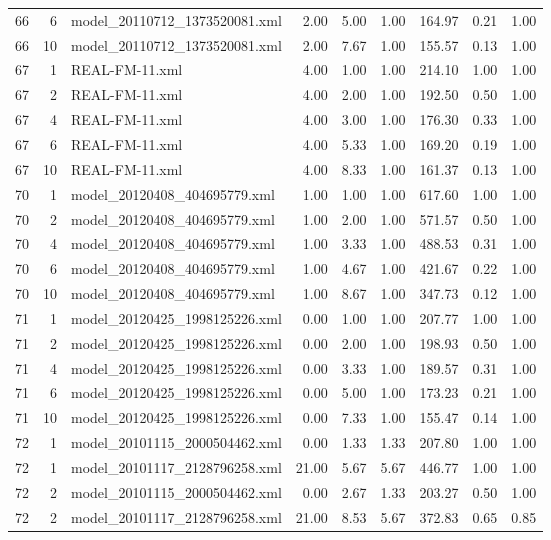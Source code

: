 \begin{table}[ht]
\begin{tabular}{rrlrrrrrr}
   66 &   6 & model\_20110712\_1373520081.xml & 2.00 & 5.00 & 1.00 & 164.97 & 0.21 & 1.00 \\ 
   66 &  10 & model\_20110712\_1373520081.xml & 2.00 & 7.67 & 1.00 & 155.57 & 0.13 & 1.00 \\ 
   67 &   1 & REAL-FM-11.xml & 4.00 & 1.00 & 1.00 & 214.10 & 1.00 & 1.00 \\ 
   67 &   2 & REAL-FM-11.xml & 4.00 & 2.00 & 1.00 & 192.50 & 0.50 & 1.00 \\ 
   67 &   4 & REAL-FM-11.xml & 4.00 & 3.00 & 1.00 & 176.30 & 0.33 & 1.00 \\ 
   67 &   6 & REAL-FM-11.xml & 4.00 & 5.33 & 1.00 & 169.20 & 0.19 & 1.00 \\ 
   67 &  10 & REAL-FM-11.xml & 4.00 & 8.33 & 1.00 & 161.37 & 0.13 & 1.00 \\ 
   70 &   1 & model\_20120408\_404695779.xml & 1.00 & 1.00 & 1.00 & 617.60 & 1.00 & 1.00 \\ 
   70 &   2 & model\_20120408\_404695779.xml & 1.00 & 2.00 & 1.00 & 571.57 & 0.50 & 1.00 \\ 
   70 &   4 & model\_20120408\_404695779.xml & 1.00 & 3.33 & 1.00 & 488.53 & 0.31 & 1.00 \\ 
   70 &   6 & model\_20120408\_404695779.xml & 1.00 & 4.67 & 1.00 & 421.67 & 0.22 & 1.00 \\ 
   70 &  10 & model\_20120408\_404695779.xml & 1.00 & 8.67 & 1.00 & 347.73 & 0.12 & 1.00 \\ 
   71 &   1 & model\_20120425\_1998125226.xml & 0.00 & 1.00 & 1.00 & 207.77 & 1.00 & 1.00 \\ 
   71 &   2 & model\_20120425\_1998125226.xml & 0.00 & 2.00 & 1.00 & 198.93 & 0.50 & 1.00 \\ 
   71 &   4 & model\_20120425\_1998125226.xml & 0.00 & 3.33 & 1.00 & 189.57 & 0.31 & 1.00 \\ 
   71 &   6 & model\_20120425\_1998125226.xml & 0.00 & 5.00 & 1.00 & 173.23 & 0.21 & 1.00 \\ 
   71 &  10 & model\_20120425\_1998125226.xml & 0.00 & 7.33 & 1.00 & 155.47 & 0.14 & 1.00 \\ 
   72 &   1 & model\_20101115\_2000504462.xml & 0.00 & 1.33 & 1.33 & 207.80 & 1.00 & 1.00 \\ 
   72 &   1 & model\_20101117\_2128796258.xml & 21.00 & 5.67 & 5.67 & 446.77 & 1.00 & 1.00 \\ 
   72 &   2 & model\_20101115\_2000504462.xml & 0.00 & 2.67 & 1.33 & 203.27 & 0.50 & 1.00 \\ 
   72 &   2 & model\_20101117\_2128796258.xml & 21.00 & 8.53 & 5.67 & 372.83 & 0.65 & 0.85 \\ 

\end{tabular}
\end{table}
